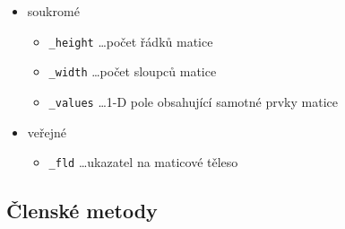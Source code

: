 \documentclass[11pt,a4paper]{article}
\begin{document}
\begin{itemize}
  \item soukromé
  \begin{itemize}
    \item \verb=_height= \ldots počet řádků matice
    \item \verb=_width= \ldots počet sloupců matice
    \item \verb=_values= \ldots 1-D pole obsahující samotné prvky matice
  \end{itemize}
  \item veřejné
  \begin{itemize}
    \item \verb=_fld= \ldots ukazatel na maticové těleso
  \end{itemize}
\end{itemize}

\subsection{Členské metody}
\end{document}
